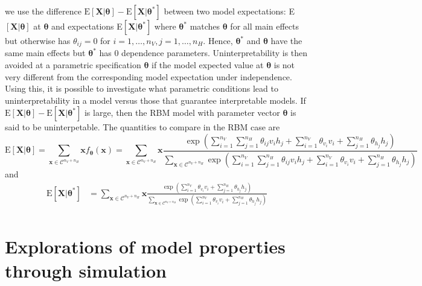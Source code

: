 \documentclass[12pt]{article}
\theoremstyle{definition}
\newcommand{\nv}{{n_{\scriptscriptstyle V}}}
\newcommand{\nh}{{n_{\scriptscriptstyle H}}}
\begin{document}
we use the difference
\(\text{E}\left[\boldsymbol X | \boldsymbol \theta\right] - \text{E}\left[\boldsymbol X | \boldsymbol \theta^* \right]\)
between two model expectations:
E\(\left[\boldsymbol X | \boldsymbol \theta\right]\) at
\(\boldsymbol \theta\) and expectations
E\(\left[\boldsymbol X | \boldsymbol \theta^* \right]\) where
\(\boldsymbol \theta^*\) matches \(\boldsymbol \theta\) for all main
effects but otherwise has \(\theta_{ij} = 0\) for
\(i = 1, \dots, \nv, j = 1, \dots, \nh\). Hence,
\(\boldsymbol \theta^*\) and \(\boldsymbol \theta\) have the same main
effects but \(\boldsymbol \theta^*\) has \(0\) dependence parameters.
Uninterpretability is then avoided at a parametric specification
\(\boldsymbol \theta\) if the model expected value at
\(\boldsymbol \theta\) is not very different from the corresponding
model expectation under independence. Using this, it is possible to
investigate what parametric conditions lead to uninterpretability in a
model versus those that guarantee interpretable models. If
\(\text{E}\left[\boldsymbol X | \boldsymbol \theta\right] - \text{E}\left[\boldsymbol X | \boldsymbol \theta^*\right]\)
is large, then the RBM model with parameter vector
\(\boldsymbol \theta\) is said to be uninterpetable. The quantities to
compare in the RBM case are \[
\text{E}\left[\boldsymbol X | \boldsymbol \theta\right] = \sum\limits_{\boldsymbol x \in \mathcal{C}^{\nv + \nh}} \boldsymbol x f_{\boldsymbol \theta}(\boldsymbol x) = \sum\limits_{\boldsymbol x \in \mathcal{C}^{\nv + \nh}} \boldsymbol x \frac{\exp\left(\sum\limits_{i = 1}^\nv \sum\limits_{j=1}^\nh \theta_{ij} v_i h_j + \sum\limits_{i = 1}^\nv\theta_{v_i} v_i + \sum\limits_{j = 1}^\nh\theta_{h_j} h_j\right)}{\sum\limits_{\boldsymbol x \in \mathcal{C}^{\nv + \nh}}\exp\left(\sum\limits_{i = 1}^\nv \sum\limits_{j=1}^\nh \theta_{ij} v_i h_j + \sum\limits_{i = 1}^\nv\theta_{v_i} v_i + \sum\limits_{j = 1}^\nh\theta_{h_j} h_j\right)}
\] and
\begin{align*}
\text{E}\left[\boldsymbol X | \boldsymbol 
\theta^*\right] &= \sum\limits_{\boldsymbol x \in \mathcal{C}^{\nv + \nh}} \boldsymbol x \frac{\exp\left(\sum\limits_{i = 1}^\nv \theta_{v_i} v_i + \sum\limits_{j = 1}^\nh\theta_{h_j} h_j\right)}{\sum\limits_{\boldsymbol x \in \mathcal{C}^{\nv + \nh}}\exp\left(\sum\limits_{i = 1}^\nv\theta_{v_i} v_i + \sum\limits_{j = 1}^\nh\theta_{h_j} h_j\right)} \\
\end{align*}
\section{Explorations of model properties through
simulation}\label{explorations-of-model-properties-through-simulation}
\end{document}
